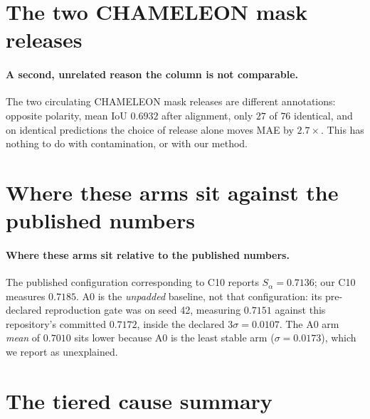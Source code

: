 \documentclass{article} %
\begin{document}
\section{The two CHAMELEON mask releases}

\paragraph{A second, unrelated reason the column is not comparable.} The two circulating CHAMELEON
mask releases are different annotations: opposite polarity, mean IoU $0.6932$ after alignment, only
$27$ of $76$ identical, and on identical predictions the choice of release alone moves MAE by
$2.7\times$. This has nothing to do with contamination, or with our method.


\section{Where these arms sit against the published numbers}
\label{app:anchor}

\paragraph{Where these arms sit relative to the published numbers.} The published configuration
corresponding to C10 reports $S_\alpha = 0.7136$; our C10 measures $0.7185$. A0 is the \emph{unpadded}
baseline, not that configuration: its pre-declared reproduction gate was on seed 42, measuring
$0.7151$ against this repository's committed $0.7172$, inside the declared $3\sigma = 0.0107$. The A0
arm \emph{mean} of $0.7010$ sits lower because A0 is the least stable arm ($\sigma = 0.0173$), which
we report as unexplained.


\section{The tiered cause summary}
\label{app:causes}
\end{document}
